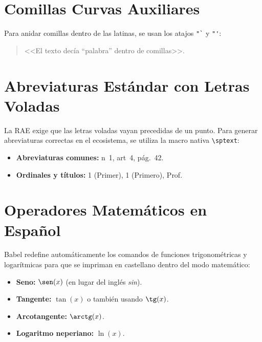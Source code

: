\documentclass{article}
\begin{document}
\section{Comillas Curvas Auxiliares}
Para anidar comillas dentro de las latinas, se usan los atajos \verb+"`+
y \verb+"'+:

\begin{quotation}
<<El texto decía "`palabra"' dentro de comillas>>.
\end{quotation}

\section{Abreviaturas Estándar con Letras Voladas}
La RAE exige que las letras voladas vayan precedidas de un punto. Para generar
abreviaturas correctas en el ecosistema, se utiliza la macro nativa \verb+\sptext+:

\begin{itemize}
    \item \textbf{Abreviaturas comunes:} n~1, art~4, pág.~42.
    \item \textbf{Ordinales y títulos:} 1 (Primer), 1 (Primero), Prof.
\end{itemize}

\section{Operadores Matemáticos en Español}
Babel redefine automáticamente los comandos de funciones trigonométricas y
logarítmicas para que se impriman en castellano dentro del modo matemático:

\begin{itemize}
    \item \textbf{Seno:} $\sen(x)$ (en lugar del inglés \emph{sin}).
    \item \textbf{Tangente:} $\tan(x)$ o también usando $\tg(x)$.
    \item \textbf{Arcotangente:} $\arctg(x)$.
    \item \textbf{Logaritmo neperiano:} $\ln(x)$.
\end{itemize}
\end{document}
